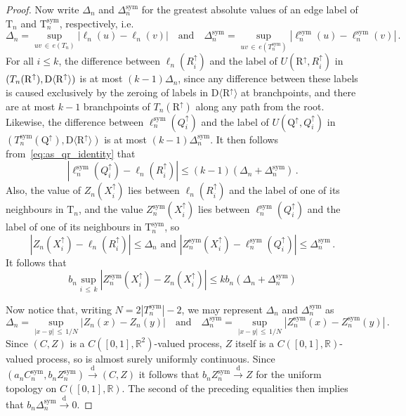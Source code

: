 \documentclass[AHL,Unicode,longabstracts,published]{cedram}
\providecommand{\R}{}
\renewcommand{\R}{\mathbb{R}}
\newcommand{\rD}{\mathrm{D}}
\newcommand{\rQ}{\mathrm{Q}}
\newcommand{\rR}{\mathrm{R}}
\newcommand{\rT}{\mathrm{T}}
\DeclareMathOperator{\sym}{sym}
\newcommand{\unif}{\ensuremath{X}}
\newcommand{\angles}[1]{\langle #1 \rangle}
\newcommand{\convdist}{\ensuremath{\stackrel{\mathrm{d}}{\rightarrow}}}
\newcommand{\R}{\mathbb{R}}
\begin{document}
\begin{proof}
Now write $\Delta_n$ and $\Delta_n^{\sym}$ for the greatest absolute values of an edge label of $\rT_n$ and $\rT_n^{\sym}$, respectively, i.e.
\[
\Delta_n =
\sup_{uv\,\in\,e(T_n)} \left|\ell_n(u)-\ell_n(v)\right| \quad \text{and} \quad
\Delta_n^{\sym} = \sup_{uv\,\in\,e\left(T_n^{\sym}\right)} \left|\ell_n^{\sym}(u)-\ell_n^{\sym}(v)\right|\,.
\]
For all $i \le k$, the difference between $\ell_n(R_i^\uparrow)$ and the label of $U(\rR^\uparrow,R_i^\uparrow)$ in $(T_n(\rR^\uparrow),\linebreak\rD\angles{\rR^\uparrow})$ is at most $(k-1) \Delta_n$, since any difference between these labels is caused exclusively by the zeroing of labels in $\rD\angles{\rR^\uparrow}$ at branchpoints, and there are at most $k-1$ branchpoints of $T_n(\rR^\uparrow)$ along any path from the root. Likewise, the difference between $\ell_n^{\sym}(Q_i^\uparrow)$ and the label of $U(\rQ^\uparrow,Q_i^\uparrow)$ in $(T_n^{\sym}(\rQ^\uparrow),\rD\angles{\rR^\uparrow})$ is at most $(k-1) \Delta_n^{\sym}$. It then follows from~\eqref{eq:as_qr_identity} that
\[
\left|\ell_n^{\sym}\left(Q_i^\uparrow\right)-\ell_n\left(R_i^\uparrow\right)\right|
\le (k-1)\left(\Delta_n+\Delta_n^{\sym}\right)\,.
\]
Also, the value of $Z_n(\unif_i^\uparrow)$ lies between $\ell_n(R_i^\uparrow)$ and the label of one of its neighbours in $\rT_n$, and the value $Z_n^{\sym}(\unif_i^\uparrow)$ lies between $\ell_n^{\sym}(Q_i^\uparrow)$ and the label of one of its neighbours in $\rT_n^{\sym}$, so
\[
\left|Z_n\left(\unif_i^\uparrow\right) - \ell_n\left(R_i^\uparrow\right)\right| \le \Delta_n
\text{ and } \left|Z_n^{\sym}\left(\unif_i^\uparrow\right) - \ell_n^{\sym}\left(Q_i^\uparrow\right)\right|
\le \Delta_n^{\sym}\,.
\]
It follows that
\begin{equation}\label{eq:z_diff_delta_bd}
b_n \sup_{i\,\le\,k} \left|Z_n^{\sym}\left(\unif_i^\uparrow\right) - Z_n\left(\unif_i^\uparrow\right)\right| \le k b_n \left(\Delta_n+\Delta_n^{\sym}\right)
\end{equation}

Now notice that, writing $N=2|T_n^{\sym}|-2$, we may represent $\Delta_n$ and $\Delta_n^{\sym}$ as
\[
\Delta_n = \sup_{|x-y|\,\le\,1/N} \left|Z_n(x)-Z_n(y)\right|
\quad \text{and} \quad
\Delta_n^{\sym} = \sup_{|x-y|\,\le\,1/N} \left|Z_n^{\sym}(x)-Z_n^{\sym}(y)\right|\,.
\]
Since $(C,Z)$ is a $C([0,1],\R^2)$-valued process, $Z$ itself is a $C([0,1],\R)$-valued process, so is almost surely uniformly continuous. Since $(a_nC_n^{\sym},b_nZ_n^{\sym}) \convdist (C,Z)$ it follows that $b_n Z_n^{\sym} \convdist Z$ for the uniform topology on $C([0,1],\R)$. The second of the preceding equalities then implies that $b_n \Delta_n^{\sym} \convdist 0$.


\end{proof}
\end{document}
